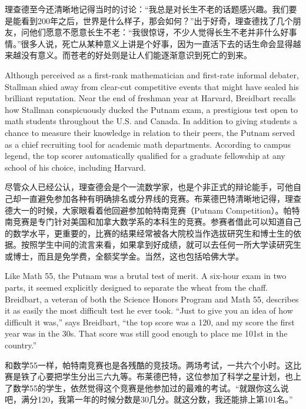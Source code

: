 \ifdefined\chs
理查德至今还清晰地记得当时的讨论：``我总是对长生不老的话题感兴趣。我们要是能看到200年之后，世界是什么样子，那会如何？''出于好奇，理查德找了几个朋友，问他们愿意不愿意长生不老：``我很惊讶，不少人觉得长生不老并非什么好事情。''很多人说，死亡从某种意义上讲是个好事，因为一直活下去的话生命会显得越来越没有意义。而苍老的好处则是让人们能逐渐意识到死亡的到来。
\fi

\ifdefined\eng
Although perceived as a first-rank mathematician and first-rate informal debater, Stallman shied away from clear-cut competitive events that might have sealed his brilliant reputation. Near the end of freshman year at Harvard, Breidbart recalls how Stallman conspicuously ducked the Putnam exam, a prestigious test open to math students throughout the U.S. and Canada. In addition to giving students a chance to measure their knowledge in relation to their peers, the Putnam served as a chief recruiting tool for academic math departments. According to campus legend, the top scorer automatically qualified for a graduate fellowship at any school of his choice, including Harvard.
\fi

\ifdefined\chs
尽管众人已经公认，理查德会是个一流数学家，也是个非正式的辩论能手，可他自己却一直避免参加各种有明确排名或分界线的竞赛。布莱德巴特清晰地记得，理查德大一的时候，大家眼看着他回避参加帕特南竞赛（Putnam Competition）。帕特南竞赛是专门针对美国和加拿大数学系的本科生的竞赛。参赛者借此可以知道自己的数学水平，更重要的，比赛的结果经常被各大院校当作选拔研究生和博士生的依据。按照学生中间的流言来看，如果拿到好成绩，就可以去任何一所大学读研究生或博士，而且是免学费，全额奖学金。当然，这也包括哈佛大学。
\fi

\ifdefined\eng
Like Math 55, the Putnam was a brutal test of merit. A six-hour exam in two parts, it seemed explicitly designed to separate the wheat from the chaff. Breidbart, a veteran of both the Science Honors Program and Math 55, describes it as easily the most difficult test he ever took. ``Just to give you an idea of how difficult it was,'' says Breidbart, ``the top score was a 120, and my score the first year was in the 30s. That score was still good enough to place me 101st in the country.''
\fi

\ifdefined\chs
和数学55一样，帕特南竞赛也是各残酷的竞技场。两场考试，一共六个小时。这比赛是铁了心要把学生分出三六九等。布莱德巴特，这位参加了科学之星计划，也上了数学55的学生，依然觉得这个竞赛是他参加过的最难的考试。``就跟你这么说吧，满分120，我第一年的时候分数是30几分。就这分数，我还能排上第101名。''
\fi

